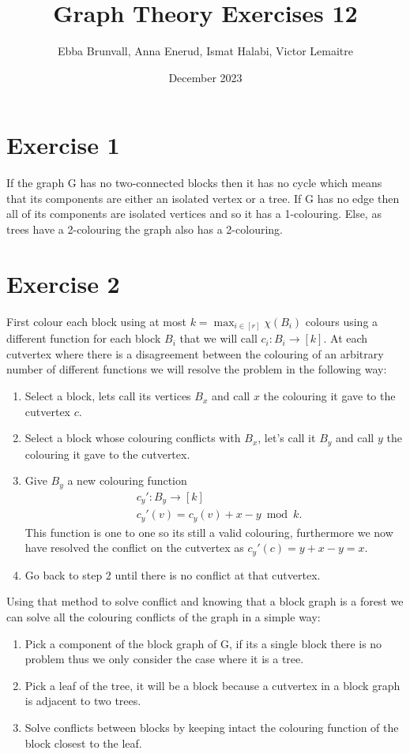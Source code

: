 \documentclass{article}
\title{Graph Theory Exercises 12}
\author{Ebba Brunvall, Anna Enerud, Ismat Halabi, Victor Lemaitre}
\date{December 2023}
\begin{document}
\maketitle

\section*{Exercise 1}
If the graph G has no two-connected blocks then it has no cycle which means that its components are either an isolated vertex or a tree. If G has no edge then all of its components are isolated vertices and so it has a 1-colouring. Else, as trees have a 2-colouring the graph also has a 2-colouring. 

\section*{Exercise 2}
First colour each block using at most $k = \max_{i\in[r]} \chi(B_i)$ colours using a different function for each block $B_i$ that we will call $c_i : B_i \rightarrow [k]$.
At each cutvertex where there is a disagreement between the colouring of an arbitrary number of different functions we will resolve the problem in the following way:
\begin{enumerate}
\item Select a block, lets call its vertices $B_x$ and call $x$ the colouring it gave to the cutvertex $c$.
\item Select a block whose colouring conflicts with $B_x$, let's call it $B_y$ and call $y$ the colouring it gave to the cutvertex.
\item Give $B_y$ a new colouring function
\begin{align*} 
&c_y' : B_y \rightarrow [k] \\ 
&c_y'(v) = c_y(v) + x-y \bmod{k}.
\end{align*}
This function is one to one so its still a valid colouring, furthermore we now have resolved the conflict on the cutvertex as $c_y'(c) = y + x - y = x$.
\item Go back to step 2 until there is no conflict at that cutvertex.
\end{enumerate}

Using that method to solve conflict and knowing that a block graph is a forest we can solve all the colouring conflicts of the graph in a simple way:
\begin{enumerate}
\item Pick a component of the block graph of G, if its a single block there is no problem thus we only consider the case where it is a tree.
\item Pick a leaf of the tree, it will be a block because a cutvertex in a block graph is adjacent to two trees.
\item Solve conflicts between blocks by keeping intact the colouring function of the block closest to the leaf.

\end{enumerate}
\end{document}
